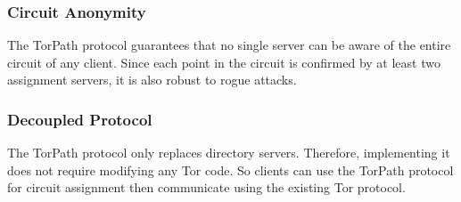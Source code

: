 \subsubsection{Circuit Anonymity}
The TorPath protocol guarantees that no single server can be aware of the entire circuit of any client. Since each point in the circuit is confirmed by at least two assignment servers, it is also robust to rogue attacks.

\subsubsection{Decoupled Protocol}
The TorPath protocol only replaces directory servers. Therefore, implementing it does not require modifying any Tor code. So clients can use the TorPath protocol for circuit assignment then communicate using the existing Tor protocol.